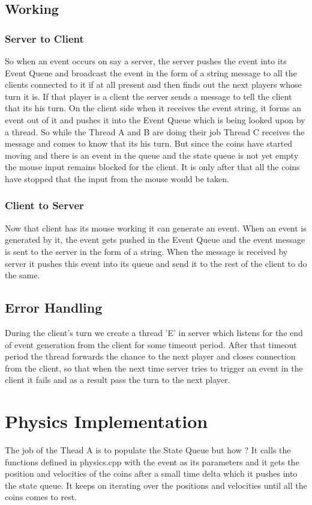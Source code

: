 \documentclass[11pt,a4paper,oneside]{report}
\begin{document}
\subsection{Working}
\subsubsection{Server to Client}
So when an event occurs on say a server, the server pushes the event into its Event Queue and broadcast the event in the form of a string message to all the clients connected to it if at all present and then finds out the next players whose turn it is. If that player is a client the server sends a message to tell the client that its his turn.
On the client side when it receives the event string, it forms an event out of it and pushes it into the Event Queue which is being looked upon by a thread. So while the Thread A and B are doing their job Thread C receives the message and comes to know that its his turn. But since the coins have started moving and there is an event in the queue and the state queue is not yet empty the mouse input remains blocked for the client. It is only after that all the coins have stopped that the input from the mouse would be taken.
\subsubsection{Client to Server}
Now that client has its mouse working it can generate an event. When an event is generated by it, the event gets pushed in the Event Queue and the event message is sent to the server in the form of a string. When the message is received by server it pushes this event into its queue and send it to the rest of the client to do the same.
\subsection{Error Handling}
During the client's turn we create a thread 'E' in server which listens for the end of event generation from the client for some timeout period. After that timeout period the thread forwards the chance to the next player and closes connection from the client, so that when the next time server tries to trigger an event in the client it fails and as a result pass the turn to the next player.
\section{Physics Implementation}
The job of the Thead A is to populate the State Queue but how ? It calls the functions defined in physics.cpp with the event as its parameters and it gets the position and velocities of the coins after a small time delta which it pushes into the state queue. It keeps on iterating over the positions and velocities until all the coins comes to rest.
\end{document}
